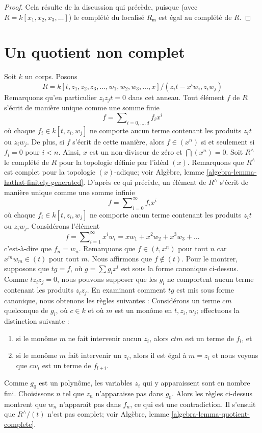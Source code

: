 \begin{proof}
Cela résulte de la discussion qui précède, puisque (avec $R = k[x_1, x_2, x_3, \ldots]$)
le complété du localisé $R_{\mathfrak m}$ est égal au
complété de $R$.
\end{proof}





\section{Un quotient non complet}
\label{section-noncomplete-quotient}

\noindent
Soit $k$ un corps. Posons
$$
R = k[t, z_1, z_2, z_3, \ldots, w_1, w_2, w_3, \ldots, x]/
(z_it - x^iw_i, z_i w_j)
$$
Remarquons qu'en particulier $z_iz_jt = 0$ dans cet anneau. Tout élément $f$ de $R$
s'écrit de manière unique comme une somme finie
$$
f = \sum\nolimits_{i = 0, \ldots, d} f_i x^i
$$
où chaque $f_i \in k[t, z_i, w_j]$ ne comporte aucun terme contenant les produits
$z_it$ ou $z_iw_j$. De plus, si $f$ s'écrit de cette manière, alors
$f \in (x^n)$ si et seulement si $f_i = 0$ pour $i < n$.
Ainsi, $x$ est un non-diviseur de zéro et $\bigcap (x^n) = 0$.
Soit $R^\wedge$ le complété de $R$ pour la topologie définie par l'idéal $(x)$.
Remarquons que $R^\wedge$ est complet pour la topologie $(x)$-adique; voir
Algèbre, lemme \ref{algebra-lemma-hathat-finitely-generated}.
D'après ce qui précède, un élément de $R^\wedge$ s'écrit de manière unique
comme une somme infinie
$$
f = \sum\nolimits_{i = 0}^\infty f_i x^i
$$
où chaque $f_i \in k[t, z_i, w_j]$ ne comporte aucun terme contenant les produits
$z_it$ ou $z_iw_j$. Considérons l'élément
$$
f = \sum\nolimits_{i = 1}^\infty x^i w_i =
xw_1 + x^2w_2 + x^3w_3 + \ldots
$$
c'est-à-dire que $f_n = w_n$. Remarquons que $f \in (t , x^n)$ pour tout $n$
car $x^mw_m \in (t)$ pour tout $m$.
Nous affirmons que $f \not \in (t)$. Pour le montrer, supposons que
$tg = f$, où $g = \sum g_lx^l$ est sous la forme canonique ci-dessus.
Comme $tz_iz_j = 0$, nous pouvons supposer que les $g_l$ ne
comportent aucun terme contenant les produits $z_iz_j$. En examinant comment
$tg$ est mis sous forme canonique, nous obtenons les règles suivantes :
Considérons un terme $c m$ quelconque de $g_l$, où $c \in k$ et où $m$ est un
monôme en $t, z_i, w_j$; effectuons la distinction suivante :
\begin{enumerate}
\item si le monôme $m$ ne fait intervenir aucun $z_i$, alors $ctm$ est
un terme de $f_l$, et
\item si le monôme $m$ fait intervenir un $z_i$, alors il est égal à
$m = z_i$ et nous voyons que $cw_i$ est un terme de $f_{l + i}$.
\end{enumerate}
Comme $g_0$ est un polynôme, les variables $z_i$ qui y apparaissent sont en nombre fini.
Choisissons $n$ tel que $z_n$ n'apparaisse pas dans $g_0$.
Alors les règles ci-dessus montrent que $w_n$ n'apparaît pas dans $f_n$, ce qui est
une contradiction. Il s'ensuit que $R^\wedge/(t)$ n'est pas complet; voir
Algèbre, lemme \ref{algebra-lemma-quotient-complete}.

